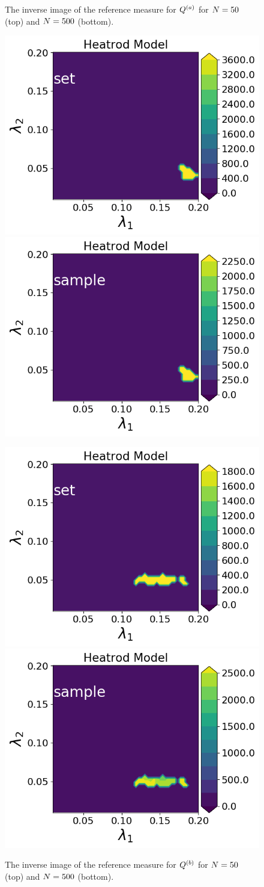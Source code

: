 \begin{figure}
\caption{The inverse image of the reference measure for $Q^{(a)}$ for $N = 50$ (top) and $N = 500$ (bottom). }
\label{fig:heatrod-convergence-a}
\end{figure}

\begin{figure}
\includegraphics[width=.45\linewidth]{examples/fig_heatrod_q2/HeatrodModel--set_N50_em.png}
\includegraphics[width=.45\linewidth]{examples/fig_heatrod_q2/HeatrodModel--sample_N50_mc.png}

\includegraphics[width=.45\linewidth]{examples/fig_heatrod_q2/HeatrodModel--set_N500_em.png}
\includegraphics[width=.45\linewidth]{examples/fig_heatrod_q2/HeatrodModel--sample_N500_mc.png}

\caption{The inverse image of the reference measure for $Q^{(b)}$ for $N = 50$ (top) and $N = 500$ (bottom). }
\label{fig:heatrod-convergence-b}
\end{figure}

